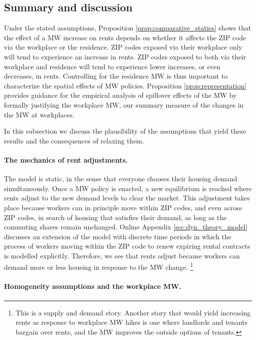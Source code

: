 \subsection{Summary and discussion}

Under the stated assumptions, Proposition \ref{prop:comparative_statics} shows 
that the effect of a MW increase on rents depends on whether it affects the 
ZIP code via the workplace or the residence.
ZIP codes exposed via their workplace only will tend to experience an 
increase in rents.
ZIP codes exposed to both via their workplace and residence will tend to 
experience lower increases, or even decreases, in rents.
Controlling for the residence MW is thus important to characterize the spatial 
effects of MW policies.
Proposition \ref{prop:representation} provides guidance for the empirical
analysis of spillover effects of the MW by formally justifying the 
workplace MW, our summary measure of the changes in the MW at workplaces.

In this subsection we discuss the plausibility of the assumptions that yield 
these results and the consequences of relaxing them.

\paragraph{The mechanics of rent adjustments.}

The model is static, in the sense that everyone chooses their housing demand 
simultaneously.
Once a MW policy is enacted, a new equilibrium is reached where rents adjust
to the new demand levels to clear the market.
This adjustment takes place because workers can in principle move within ZIP 
codes, and even across ZIP codes, in search of housing that satisfies their 
demand, as long as the commuting shares remain unchanged.
Online Appendix \ref{sec:dyn_theory_model} discusses an extension of the model
with discrete time periods in which the process of workers moving within the 
ZIP code to renew expiring rental contracts is modelled explicitly.
Therefore, we see that rents adjust because workers can demand more or less 
housing in response to the MW change.%
\footnote{This is a supply and demand story. 
    Another story that would yield increasing rents as response to workplace MW
    hikes is one where landlords and tenants bargain over rents, 
    and the MW improves the outside options of tenants.}

\paragraph{Homogeneity assumptions and the workplace MW.}

